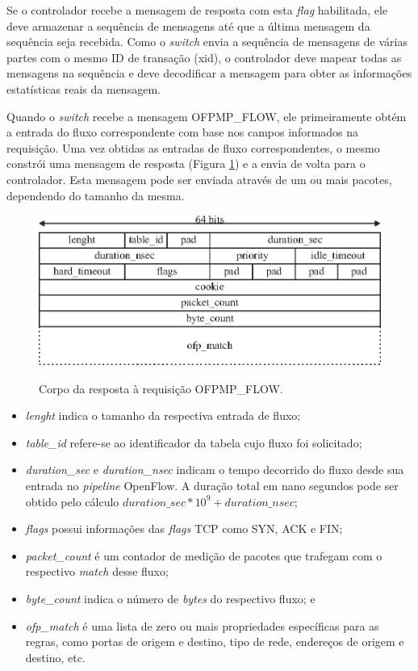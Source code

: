 Se o controlador recebe a mensagem de resposta com esta \textit{flag} habilitada, ele deve armazenar a sequência de mensagens até que a última mensagem da sequência seja recebida. Como o \textit{switch} envia a sequência de mensagens de várias partes com o mesmo ID de transação (xid), o controlador deve mapear todas as mensagens na sequência e deve decodificar a mensagem para obter as informações estatísticas reais da mensagem.

Quando o \textit{switch} recebe a mensagem OFPMP\_FLOW, ele primeiramente obtém a entrada do fluxo correspondente com base nos campos informados na requisição. Uma vez obtidas as entradas de fluxo correspondentes, o mesmo constrói uma mensagem de resposta (Figura \ref{fig:ofp-flow-stats}) e a envia de volta para o controlador. Esta mensagem pode ser enviada através de um ou mais pacotes, dependendo do tamanho da mesma.

\begin{figure}[H]
  \centering
  \caption{Corpo da resposta à requisição OFPMP\_FLOW.}
  \includegraphics[width=.80\textwidth]{images/ofpmp-flow-stats.eps}
  \label{fig:ofp-flow-stats}
\end{figure}

\begin{itemize}
    \item \textit{lenght} indica o tamanho da respectiva entrada de fluxo;
    \item \textit{table\_id} refere-se ao identificador da tabela cujo fluxo foi solicitado;
    \item \textit{duration\_sec} e \textit{duration\_nsec} indicam o tempo decorrido do fluxo desde sua entrada no \textit{pipeline} OpenFlow. A duração total em nano segundos pode ser obtido pelo cálculo $duration\_sec * 10^9 + duration\_nsec$;
    \item \textit{flags} possui informações das \textit{flags} TCP como SYN, ACK e FIN;
    \item \textit{packet\_count} é um contador de medição de pacotes que trafegam com o respectivo \textit{match} desse fluxo;
    \item \textit{byte\_count} indica o número de \textit{bytes} do respectivo fluxo; e
    \item \textit{ofp\_match} é uma lista de zero ou mais propriedades específicas para as regras, como portas de origem e destino, tipo de rede, endereços de origem e destino, etc.
\end{itemize}

